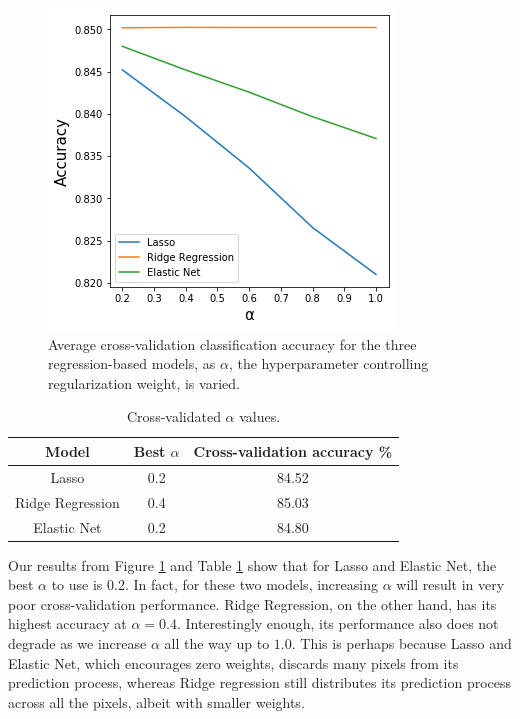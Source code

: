 \documentclass[letterpaper, 10 pt, conference]{ieeeconf}  %
\begin{document}
\begin{figure}[tb] 
\centering
\includegraphics[width=0.97\columnwidth]{images/cv_alpha.png}
\caption{Average cross-validation classification accuracy for the three regression-based models, as $\alpha$, the hyperparameter controlling regularization weight, is varied.}
\label{fig:cv_alpha}
\end{figure}

\begin{table}[ht]
\caption{Cross-validated $\alpha$ values.} %
\centering %
\begin{tabular}{c c c} 
\hline\hline 
Model & Best $\alpha$ & Cross-validation accuracy \% \\
\hline
Lasso & 0.2 & 84.52 \\
Ridge Regression & 0.4 & 85.03 \\
Elastic Net & 0.2 & 84.80 \\
\hline %
\end{tabular}
\label{table:cv} %
\end{table}

Our results from Figure \ref{fig:cv_alpha} and Table \ref{table:cv} show that for Lasso and Elastic Net, the best $\alpha$ to use is 0.2. In fact, for these two models, increasing $\alpha$ will result in very poor cross-validation performance. Ridge Regression, on the other hand, has its highest accuracy at $\alpha = 0.4$. Interestingly enough, its performance also does not degrade as we increase $\alpha$ all the way up to $1.0$. This is perhaps because Lasso and Elastic Net, which encourages zero weights, discards many pixels from its prediction process, whereas Ridge regression still distributes its prediction process across all the pixels, albeit with smaller weights.
\end{document}
